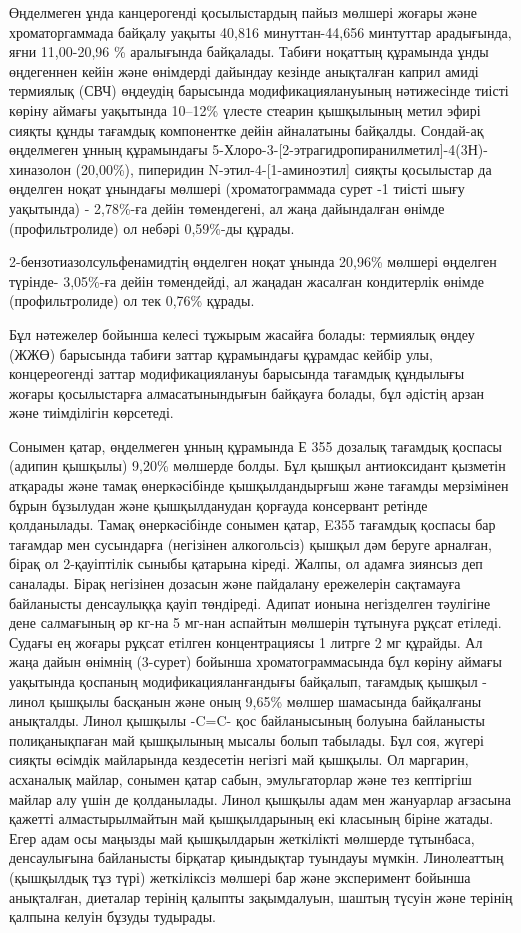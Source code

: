 \begin{multicols}{2}

Өңделмеген ұнда канцерогенді қосылыстардың пайыз мөлшері жоғары және
хроматоргаммада байқалу уақыты 40,816 минуттан-44,656 минтуттар
арадығында, яғни 11,00-20,96 \% аралығында байқалады. Табиғи ноқаттың
құрамында ұнды өңдегеннен кейін және өнімдерді дайындау кезінде
анықталған каприл амиді термиялық (СВЧ) өңдеудің барысында
модификациялануының нәтижесінде тиісті көріну аймағы уақытында 10--12\%
үлесте стеарин қышқылының метил эфирі сияқты құнды тағамдық компонентке
дейін айналатыны байқалды. Сондай-ақ өңделмеген ұнның құрамындағы
5-Хлоро-3-{[}2-этрагидропиранилметил{]}-4(3Н)-хиназолон (20,00\%),
пиперидин N-этил-4-{[}1-аминоэтил{]} сияқты қосылыстар да өңделген ноқат
ұнындағы мөлшері (хроматограммада сурет -1 тиісті шығу уақытында) -
2,78\%-ға дейін төмендегені, ал жаңа дайындалған өнімде (профильтролиде)
ол небәрі 0,59\%-ды құрады.

2-бензотиазолсульфенамидтің өңделген ноқат ұнында 20,96\% мөлшері
өңделген түрінде- 3,05\%-ға дейін төмендейді, ал жаңадан жасалған
кондитерлік өнімде (профильтролиде) ол тек 0,76\% құрады.

Бұл нәтежелер бойынша келесі тұжырым жасайға болады: термиялық өңдеу
(ЖЖӨ) барысында табиғи заттар құрамындағы құрамдас кейбір улы,
концереогенді заттар модификациялануы барысында тағамдық құндылығы
жоғары қосылыстарға алмасатынындығын байқауға болады, бұл әдістің арзан
және тиімділігін көрсетеді.

Сонымен қатар, өңделмеген ұнның құрамында Е 355 дозалық тағамдық қоспасы
(адипин қышқылы) 9,20\% мөлшерде болды. Бұл қышқыл антиоксидант қызметін
атқарады және тамақ өнеркәсібінде қышқылдандырғыш және тағамды
мерзімінен бұрын бұзылудан және қышқылданудан қорғауда консервант
ретінде қолданылады. Тамақ өнеркәсібінде сонымен қатар, E355 тағамдық
қоспасы бар тағамдар мен сусындарға (негізінен алкогольсіз) қышқыл дәм
беруге арналған, бірақ ол 2-қауіптілік сыныбы қатарына кіреді. Жалпы, ол
адамға зиянсыз деп саналады. Бірақ негізінен дозасын және пайдалану
ережелерін сақтамауға байланысты денсаулыққа қауіп төндіреді. Адипат
ионына негізделген тәулігіне дене салмағының әр кг-на 5 мг-нан аспайтын
мөлшерін тұтынуға рұқсат етіледі. Судағы ең жоғары рұқсат етілген
концентрациясы 1 литрге 2 мг құрайды. Ал жаңа дайын өнімнің (3-сурет)
бойынша хроматограммасында бұл көріну аймағы уақытында қоспаның
модификацияланғандығы байқалып, тағамдық қышқыл - линол қышқылы басқанын
және оның 9,65\% мөлшер шамасында байқалғаны анықталды. Линол қышқылы
-C=C- қос байланысының болуына байланысты полиқанықпаған май қышқылының
мысалы болып табылады. Бұл соя, жүгері сияқты өсімдік майларында
кездесетін негізгі май қышқылы. Ол маргарин, асханалық майлар, сонымен
қатар сабын, эмульгаторлар және тез кептіргіш майлар алу үшін де
қолданылады. Линол қышқылы адам мен жануарлар ағзасына қажетті
алмастырылмайтын май қышқылдарының екі класының біріне жатады. Егер адам
осы маңызды май қышқылдарын жеткілікті мөлшерде тұтынбаса, денсаулығына
байланысты бірқатар қиындықтар туындауы мүмкін. Линолеаттың (қышқылдық
тұз түрі) жеткіліксіз мөлшері бар және эксперимент бойынша анықталған,
диеталар терінің қалыпты зақымдалуын, шаштың түсуін және терінің қалпына
келуін бұзуды тудырады.


\end{multicols}

